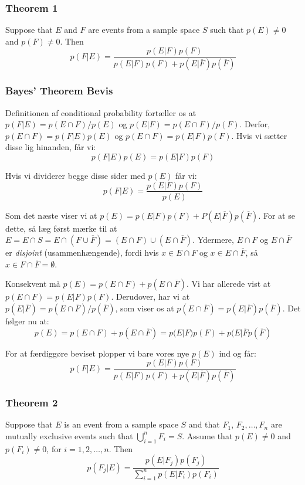 \documentclass{beamer}
\begin{document}
\begin{frame}
  \frametitle{Theorem 1}
 \begin{theorem}
   Suppose that $E$ and $F$ are events from a sample space $S$ such that $p(E) \neq 0$ and $p(F) \neq 0$. Then
  \[ p(F|E) = \frac{p(E|F)p(F)}{p(E|F)p(F)+p(E|\overline{F})p(\overline{F})} \]
 \end{theorem} 
\end{frame}

\begin{frame}[allowframebreaks]
  \frametitle{Bayes' Theorem Bevis}
  Definitionen af conditional probability fortæller os at $p(F|E) = p(E \cap F)/p(E)$ og $p(E|F) = p(E \cap F)/p(F)$. Derfor, $p(E \cap F) = p(F|E)p(E)$ og $p(E \cap F) = p(E|F)p(F)$. Hvis vi sætter disse lig hinanden, får vi:
  \[ p(F|E)p(E) = p(E|F)p(F)  \]

  Hvis vi dividerer begge disse sider med $p(E)$ får vi:
  \[ p(F|E) = \frac{p(E|F)p(F)}{p(E)} \]

  Som det næste viser vi at $p(E) = p(E|F)p(F)+P(E|\overline{F})p(\overline{F})$. For at se dette, så læg først mærke til at $E = E \cap S = E \cap (F \cup \overline{F}) = (E \cap F) \cup ( E \cap \overline{F})$. Ydermere, $E \cap F$ og $E \cap \overline{F}$ er \textit{disjoint} (usammenhængende), fordi hvis $x \in E \cap F$ og $x \in E \cap \overline{F}$, så $x \in F \cap \overline{F} = \emptyset$.

  Konsekvent må $p(E) = p(E \cap F) + p(E \cap \overline{F})$. Vi har allerede vist at $p(E \cap F) = p(E |F) p(F)$. Derudover, har vi at $p(E | \overline{F}) = p(E \cap \overline{F})/p(\overline{F})$, som viser os at $p(E \cap \overline{F}) = p(E|\overline{F})p(\overline{F})$. Det følger nu at:
  \[ p(E) = p(E \cap F) + p(E \cap \overline{F}) = p(E |F) p(F) + p(E | \overline{F} p(\overline{F}) \]

  For at færdiggøre beviset plopper vi bare vores nye $p(E)$ ind og får:
  \[ p(F|E) = \frac{p(E|F)p(F)}{p(E|F)p(F)+p(E|\overline{F})p(\overline{F})} \]
\end{frame}

\begin{frame}
  \frametitle{Theorem 2}
  \begin{theorem}
    Suppose that $E$ is an event from a sample space $S$ and that $F_{1}$, $F_{2}, \ldots, F_{n}$ are mutually exclusive events such that $\bigcup\limits_{i=1}^{n}F_{i}=S$. Assume that $p(E) \neq 0$ and $p(F_{i}) \neq 0$, for $i = 1, 2, \ldots, n$. Then
    \[ p(F_{j}|E) = \frac{p(E|F_{j}) p(F_{j})}{\sum_{i=1}^{n}p(E|F_{i})p(F_{i})} \]
  \end{theorem}
\end{frame}
\end{document}
